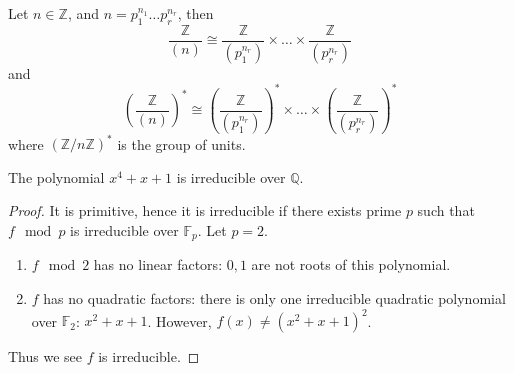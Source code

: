 \documentclass[openany]{book}
\newcommand{\Z}{\mathbb{Z}}
\newcommand{\F}{\mathbb{F}}
\newcommand{\Q}{\mathbb{Q}}
\begin{document}
\begin{prop}[6.8]
    Let $n\in\Z$, and $n=p_1^{n_1}\dots p_r^{n_r}$, then 
    \begin{equation*}
        \frac{\Z}{(n)}\cong\frac{\Z}{(p_1^{n_r})}\times\dots\times\frac{\Z}{(p_r^{n_r})}
    \end{equation*}
    and 
    \begin{equation*}
        \left(\frac{\Z}{(n)}\right)^*\cong\left(\frac{\Z}{(p_1^{n_r})}\right)^*\times\dots\times\left(\frac{\Z}{(p_r^{n_r})}\right)^*
    \end{equation*}
    where $(\Z/n\Z)^*$ is the group of units.
\end{prop}



\begin{prop}
    The polynomial $x^4+x+1$ is irreducible over $\Q$.
\end{prop}
\begin{proof}
    It is primitive, hence it is irreducible if there exists prime $p$ such that $f\mod p$ is irreducible over $\F_p$. Let $p=2$. 
    \begin{enumerate}
        \item $f\mod 2$ has no linear factors: $0,1$ are not roots of this polynomial.
        \item $f$ has no quadratic factors: there is only one irreducible quadratic polynomial over $\F_2$: $x^2+x+1$. However, $f(x)\neq (x^2+x+1)^2$.
    \end{enumerate}
    Thus we see $f$ is irreducible.
\end{proof}










\end{document}
